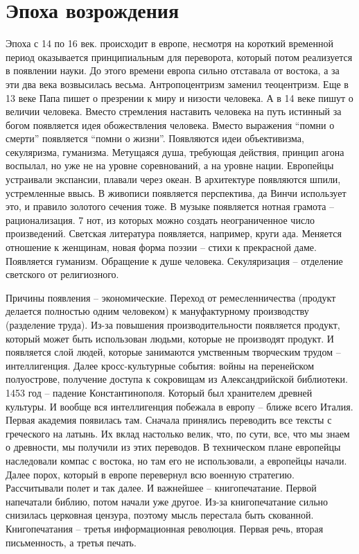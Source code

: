 \documentclass[a4paper, 12pt]{article}
\begin{document}
\section{Эпоха возрождения}

Эпоха с 14 по 16 век. происходит в европе, несмотря на короткий временной период оказывается принципиальным для переворота, который потом реализуется в появлении науки. До этого времени европа сильно отставала от востока, а за эти два века возвысилась весьма. Антропоцентризм заменил теоцентризм. Еще в 13 веке Папа пишет о презрении к миру и низости человека. А в 14 веке пишут о величии человека. Вместо стремления наставить человека на путь истинный за богом появляется идея обожествления человека. Вместо выражения ``помни о смерти'' появляется ``помни о жизни''. 
Появляются идеи объективизма, секуляризма, гуманизма. Метущаяся душа, требующая действия, принцип агона воспылал, но уже не на уровне соревнований, а на уровне нации. Европейцы устраивали экспансии, плавали через океан. В архитектуре появляются шпили, устремленные ввысь. В живописи появляется перспектива, да Винчи использует это, и правило золотого сечения тоже. В музыке появляется нотная грамота -- рационализация. 7 нот, из которых можно создать неограниченное число произведений. Светская литература появляется, например, круги ада. Меняется отношение к женщинам, новая форма поэзии -- стихи к прекрасной даме. Появляется гуманизм. Обращение к душе человека. Секуляризация -- отделение светского от религиозного. 

Причины появления -- экономические. Переход от ремесленничества (продукт делается полностью одним человеком) к мануфактурному производству (разделение труда). Из-за повышения производительности появляется продукт, который может быть использован людьми, которые не производят продукт. И появляется слой людей, которые занимаются умственным творческим трудом -- интеллигенция. Далее кросс-культурные события: войны на перенейском полуострове, получение доступа к сокровищам из Александрийской библиотеки. 1453 год -- падение Константинополя. Который был хранителем древней культуры. И вообще вся интеллигенция побежала в европу -- ближе всего Италия. Первая академия появилась там. Сначала принялись переводить все тексты с греческого на латынь. Их вклад настолько велик, что, по сути, все, что мы знаем о древности, мы получили из этих переводов. В техническом плане европейцы наследовали компас с востока, но там его не использовали, а европейцы начали. Далее порох, который в европе перевернул всю военную стратегию. Рассчитывали полет и так далее. И важнейшее -- книгопечатание. Первой напечатали библию, потом начали уже другое. Из-за книгопечатание сильно снизилась церковная цензура, поэтому мысль перестала быть скованной. Книгопечатания -- третья информационная революция. Первая речь, вторая письменность, а третья печать.
\end{document}
